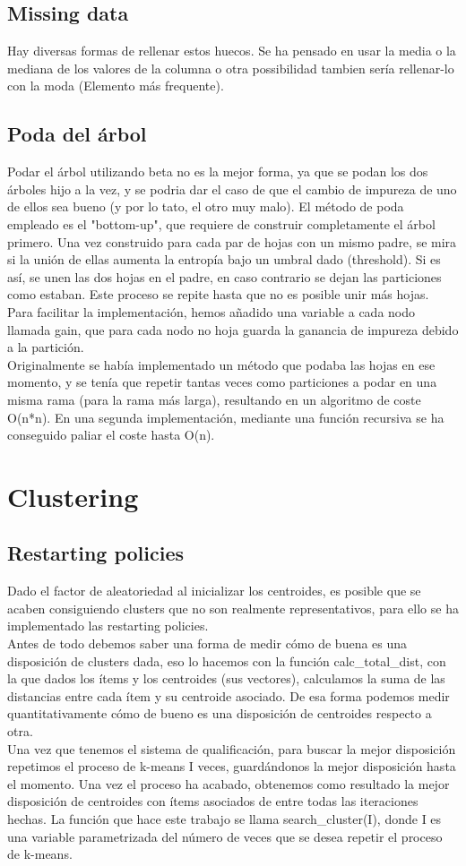 \documentclass{article}
\begin{document}
\subsection{Missing data}
Hay diversas formas de rellenar estos huecos. Se ha pensado en usar la media o la mediana de los valores de la columna o otra possibilidad tambien sería rellenar-lo con la moda (Elemento más frequente).
\subsection{Poda del árbol}
Podar el árbol utilizando beta no es la mejor
forma, ya que se podan los dos árboles hijo a la vez,
y se podria dar el caso de que el cambio de impureza de 
uno de ellos sea bueno (y por lo tato, el otro muy malo).
El método de poda empleado es el "bottom-up", que 
requiere de construir completamente el árbol primero.
Una vez construido para cada par de hojas con un mismo
padre, se mira si la unión de ellas aumenta la entropía
bajo un umbral dado (threshold). Si es así, se unen las 
dos hojas en el padre, en caso contrario se dejan las particiones
como estaban. Este proceso se repite hasta que no es posible
unir más hojas.\\
Para facilitar la implementación, hemos añadido una variable
a cada nodo llamada gain, que para cada nodo no hoja guarda 
la ganancia de impureza debido a la partición.\\ 
Originalmente se había implementado un método que podaba las hojas
en ese momento, y se tenía que repetir tantas veces como particiones 
a podar en una misma rama (para la rama más larga), resultando en un 
algoritmo de coste O(n*n).
En una segunda implementación, mediante una función recursiva se ha 
conseguido paliar el coste hasta O(n).

\section{Clustering}
\subsection{Restarting policies}
Dado el factor de aleatoriedad al inicializar los centroides,
es posible que se acaben consiguiendo clusters que no son 
realmente representativos, para ello se ha implementado las
restarting policies.\\
Antes de todo debemos saber una forma de medir cómo de buena
es una disposición de clusters dada, eso lo hacemos con la
función calc\_total\_dist, con la que dados los ítems y los 
centroides (sus vectores), calculamos la suma de las distancias
entre cada ítem y su centroide asociado. De esa forma podemos medir
quantitativamente cómo de bueno es una disposición de centroides 
respecto a otra.\\
Una vez que tenemos el sistema de qualificación, para buscar la mejor
disposición repetimos el proceso de k-means I veces, guardándonos
la mejor disposición hasta el momento. Una vez el proceso ha acabado,
obtenemos como resultado la mejor disposición de centroides con ítems
asociados de entre todas las iteraciones hechas. La función que hace este
trabajo se llama search\_cluster(I), donde I es una variable parametrizada 
del número de veces que se desea repetir el proceso de k-means. 
\end{document}
